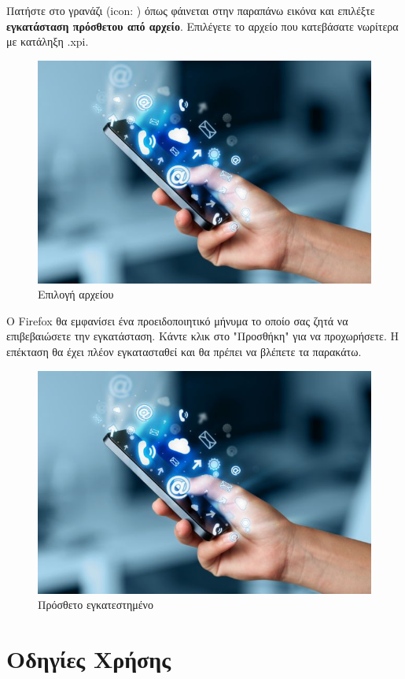 \documentclass{article}
\begin{document}
Πατήστε στο γρανάζι (icon: \faCog) όπως φάινεται στην παραπάνω εικόνα και επιλέξτε \textbf{εγκατάσταση πρόσθετου από αρχείο}. Επιλέγετε το αρχείο που κατεβάσατε νωρίτερα με κατάληξη .xpi.

\begin{figure}[H]
    \includegraphics[width=\textwidth]{logo}
    \caption*{Επιλογή αρχείου}
\end{figure}

Ο Firefox θα εμφανίσει ένα προειδοποιητικό μήνυμα το οποίο σας ζητά να επιβεβαιώσετε την εγκατάσταση. Κάντε κλικ στο "Προσθήκη" για να προχωρήσετε. Η επέκταση θα έχει πλέον εγκατασταθεί και θα πρέπει να βλέπετε τα παρακάτω.

\begin{figure}[H]
    \includegraphics[width=\textwidth]{logo}
    \caption*{Πρόσθετο εγκατεστημένο}
\end{figure}

\section*{Οδηγίες Χρήσης}
\end{document}
